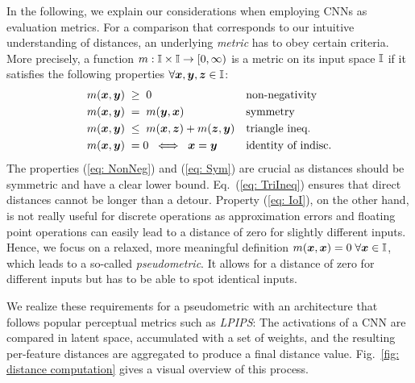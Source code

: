 \documentclass{article}
\begin{document}
In the following, we explain our considerations when employing CNNs as evaluation metrics. For a comparison that corresponds to our intuitive understanding of distances, an underlying \emph{metric} has to obey certain criteria. More precisely, a function $m : {\mathbb{I}} \times {\mathbb{I}} \to [0, \infty)$ is a metric on its input space ${\mathbb{I}}$ if it satisfies the following properties $\forall {\bm{x}},{\bm{y}},{\bm{z}} \in {\mathbb{I}}$:
\begin{align}
    m({\bm{x}},{\bm{y}}) \; &\geq \; 0                && \text{non-negativity} \label{eq: NonNeg}\\
    m({\bm{x}},{\bm{y}}) \; &= \; m({\bm{y}},{\bm{x}})              && \text{symmetry} \label{eq: Sym}\\
    m({\bm{x}},{\bm{y}}) \; &\leq \; m({\bm{x}},{\bm{z}}) + m({\bm{z}},{\bm{y}})  && \text{triangle ineq.} \label{eq: TriIneq}\\
    m({\bm{x}},{\bm{y}}) \; &= 0 \; \iff \; {\bm{x}} = {\bm{y}}     && \text{identity of indisc.} \label{eq: IoI}
\end{align}
The properties (\ref{eq: NonNeg}) and (\ref{eq: Sym}) are crucial as distances should be symmetric and have a clear lower bound. Eq.~(\ref{eq: TriIneq}) ensures that direct distances cannot be longer than a detour. Property (\ref{eq: IoI}), on the other hand, is not really useful for discrete operations as approximation errors and floating point operations can easily lead to a distance of zero for slightly different inputs. Hence, we focus on a relaxed, more meaningful definition $m({\bm{x}},{\bm{x}}) = 0 \; \forall {\bm{x}} \in {\mathbb{I}}$, which leads to a so-called \emph{pseudometric}. It allows for a distance of zero for different inputs but has to be able to spot identical inputs. 

We realize these requirements for a pseudometric with an architecture that follows popular perceptual metrics such as \textit{LPIPS}: The activations of a CNN are compared in latent space, accumulated with a set of weights, and the resulting per-feature distances are aggregated to produce a final distance value. Fig.~\ref{fig: distance computation} gives a visual overview of this process.
\end{document}

